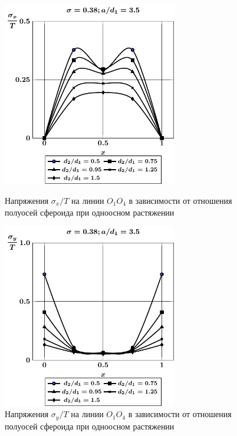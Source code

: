 \begin{figure}[h!]
\centering\footnotesize
\parbox[b]{7.5cm}{\centering\includegraphics[width=7.6cm]{cav4-prolate-oblate-a35-t1-sig_x.pdf}
\caption{Напряжения $\sigma_x/T$ на линии $O_1O_4$ в зависимости от отношения полуосей сфероида при одноосном растяжении
\label{f:10:8}}}\hfil\hfil
\parbox[b]{7.5cm}{\centering\includegraphics[width=7.6cm]{cav4-prolate-oblate-a35-t1-sig_y.pdf}
\caption{Напряжения $\sigma_y/T$ на линии $O_1O_4$ в зависимости от отношения полуосей сфероида при одноосном растяжении
\label{f:10:9}}}
\end{figure}

